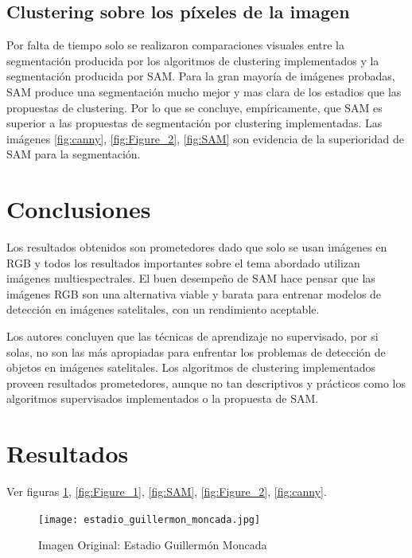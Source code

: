 \documentclass[article]{llncs}
\begin{document}
\subsection{Clustering sobre los p\'ixeles de la imagen}

Por falta de tiempo solo se realizaron comparaciones visuales entre la segmentación producida por los algoritmos de clustering 
implementados y la segmentación producida por SAM. Para la gran mayor\'ia de im\'agenes probadas, SAM produce 
una segmentación mucho mejor y mas clara de los estadios que las propuestas de clustering. Por lo que se concluye, 
emp\'iricamente, que SAM es superior a las propuestas de segmentación por clustering implementadas. Las im\'agenes 
\ref{fig:canny}, \ref{fig:Figure_2}, \ref{fig:SAM} son evidencia de la superioridad de SAM para la segmentación.

\section{Conclusiones}
Los resultados obtenidos son prometedores dado que solo se usan im\'agenes en RGB y todos los resultados importantes 
sobre el tema abordado utilizan im\'agenes multiespectrales. El buen desempeño de SAM hace pensar que las im\'agenes 
RGB son una alternativa viable y barata para entrenar modelos de detección en im\'agenes satelitales, con un rendimiento aceptable. 


Los autores concluyen que las t\'ecnicas de aprendizaje no supervisado, por si solas, no son las m\'as apropiadas 
para enfrentar los problemas de detección de objetos en im\'agenes satelitales. Los algoritmos de clustering implementados 
proveen resultados prometedores, aunque no tan descriptivos y pr\'acticos como los algoritmos supervisados implementados o la 
propuesta de SAM.

\section{Resultados}

Ver figuras \ref{fig:estadio_guillermon_moncada}, \ref{fig:Figure_1}, \ref{fig:SAM}, \ref{fig:Figure_2}, \ref{fig:canny}.

\begin{figure}[h]
  \centering
  \texttt{[image: estadio\_guillermon\_moncada.jpg]}
  \caption{Imagen Original: Estadio Guillerm\'on Moncada}
  \label{fig:estadio_guillermon_moncada}
\end{figure}
\end{document}
